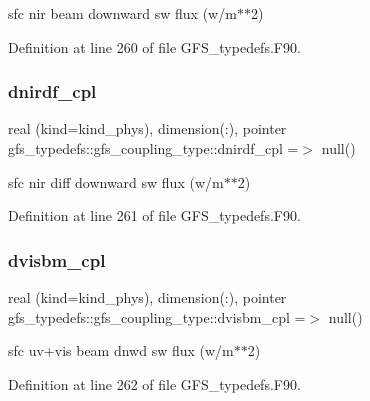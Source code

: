 sfc nir beam downward sw flux (w/m$\ast$$\ast$2) 



Definition at line 260 of file G\+F\+S\+\_\+typedefs.\+F90.

\mbox{\label{structgfs__typedefs_1_1gfs__coupling__type_a50e6629a65b37c8e1a283d910c0670d8}} 
\subsubsection{dnirdf\+\_\+cpl}
{\footnotesize\ttfamily real (kind=kind\+\_\+phys), dimension(\+:), pointer gfs\+\_\+typedefs\+::gfs\+\_\+coupling\+\_\+type\+::dnirdf\+\_\+cpl =$>$ null()}



sfc nir diff downward sw flux (w/m$\ast$$\ast$2) 



Definition at line 261 of file G\+F\+S\+\_\+typedefs.\+F90.

\mbox{\label{structgfs__typedefs_1_1gfs__coupling__type_ad6ed353acebc4fb9d7ebf0470eeed45a}} 
\subsubsection{dvisbm\+\_\+cpl}
{\footnotesize\ttfamily real (kind=kind\+\_\+phys), dimension(\+:), pointer gfs\+\_\+typedefs\+::gfs\+\_\+coupling\+\_\+type\+::dvisbm\+\_\+cpl =$>$ null()}



sfc uv+vis beam dnwd sw flux (w/m$\ast$$\ast$2) 



Definition at line 262 of file G\+F\+S\+\_\+typedefs.\+F90.

\mbox{\label{structgfs__typedefs_1_1gfs__coupling__type_a6406d97ca52a9938fb2a0add83eeec98}} 
